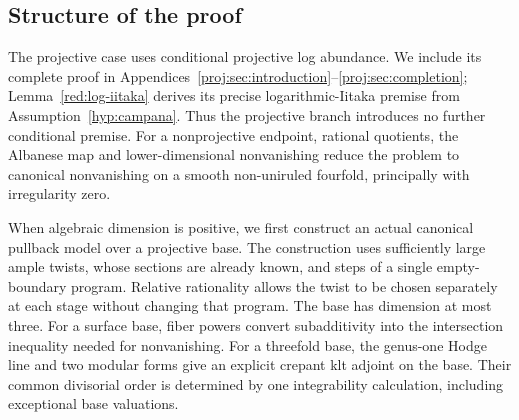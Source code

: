 \subsection{Structure of the proof}

The projective case uses conditional projective log abundance. We
include its complete proof in
Appendices~\ref{proj:sec:introduction}--\ref{proj:sec:completion};
Lemma~\ref{red:log-iitaka} derives its precise logarithmic-Iitaka
premise from Assumption~\ref{hyp:campana}. Thus the projective
branch introduces no further conditional premise. For a
nonprojective endpoint, rational quotients, the Albanese map and
lower-dimensional nonvanishing reduce the problem to canonical
nonvanishing on a smooth non-uniruled fourfold, principally with
irregularity zero.

When algebraic dimension is positive, we first construct an actual
canonical pullback model over a projective base. The construction
uses sufficiently large ample twists, whose sections are already
known, and steps of a single empty-boundary program. Relative
rationality allows the twist to be chosen separately at each stage
without changing that program. The base has dimension at most three.
For a surface base, fiber powers convert subadditivity into the
intersection inequality needed for nonvanishing. For a threefold
base, the genus-one Hodge line and two modular forms give an
explicit crepant klt adjoint on the base. Their common divisorial
order is determined by one integrability calculation, including
exceptional base valuations.

